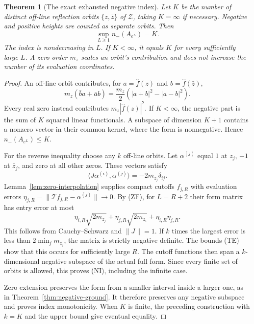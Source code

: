 \documentclass[11pt]{article}
\newtheorem{theorem}{Theorem}
\theoremstyle{remark}\newtheorem{remark}[theorem]{Remark}
\begin{document}
\begin{theorem}[The exact exhausted negative index]
\label{thm:negative-index}
Let $K$ be the number of distinct off-line reflection orbits
$\{z,\bar z\}$ of $\mathcal Z$, taking $K=\infty$ if necessary.
Negative and positive heights are counted as separate orbits.
Then
\[
 \sup_{L\ge1}n_-(A_{e^L})=K.                           \tag{NI}
\]
The index is nondecreasing in $L$. If $K<\infty$, it equals
$K$ for every sufficiently large $L$.
A zero order $m_z$ scales an orbit's contribution and does
not increase the number of its evaluation coordinates.
\end{theorem}
\begin{proof}
An off-line orbit contributes, for $a=\widehat f(z)$ and
$b=\widehat f(\bar z)$,
\[
 m_z(\bar b a+\bar a b)
              =\frac{m_z}{2}(|a+b|^2-|a-b|^2).
\]
Every real zero instead contributes $m_z|\widehat f(z)|^2$.
If $K<\infty$, the negative part is the sum of $K$ squared
linear functionals. A subspace of dimension $K+1$ contains
a nonzero vector in their common kernel, where the form is
nonnegative. Hence $n_-(A_{e^L})\le K$.

For the reverse inequality choose any $k$ off-line orbits.
Let $\alpha^{(j)}$ equal $1$ at $z_j$, $-1$ at $\bar z_j$,
and zero at all other zeros. These vectors satisfy
\[
 \langle J\alpha^{(i)},\alpha^{(j)}\rangle
                          =-2m_{z_j}\delta_{ij}.
\]
Lemma~\ref{lem:zero-interpolation} supplies compact cutoffs
$f_{j,R}$ with evaluation errors
$\eta_{j,R}=\|\mathcal T f_{j,R}-\alpha^{(j)}\|\to0$.
By (ZF), for $L=R+2$ their form matrix has entry error at most
\[
 \eta_{i,R}\sqrt{2m_{z_j}}+
 \eta_{j,R}\sqrt{2m_{z_i}}+\eta_{i,R}\eta_{j,R}.          \tag{ME}
\]
This follows from Cauchy--Schwarz and $\|J\|=1$.
If $k$ times the largest error is less than
$2\min_j m_{z_j}$, the matrix is strictly negative definite.
The bounds (TE) show that this occurs for sufficiently large
$R$. The cutoff functions then span a $k$-dimensional
negative subspace of the actual full form. Since every
finite set of orbits is allowed, this proves (NI), including
the infinite case.

Zero extension preserves the form from a smaller interval
inside a larger one, as in Theorem~\ref{thm:negative-ground}.
It therefore preserves any negative subspace and proves
index monotonicity. When $K$ is finite, the preceding construction
with $k=K$ and the upper bound give eventual equality.
\end{proof}
\end{document}
